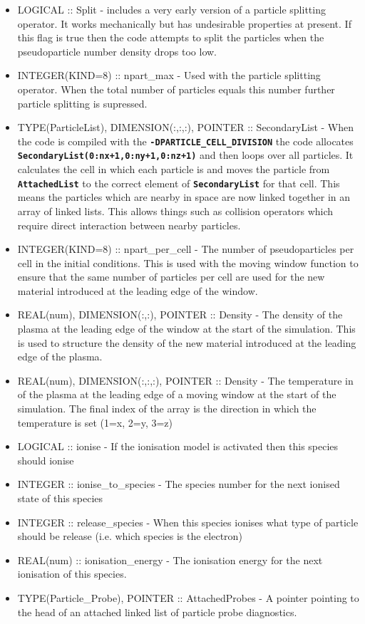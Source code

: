 \documentclass[12pt,a4paper]{article}
\newcommand{\inlinecode}[1]{{\color{warwickred} \bf\texttt{#1}}}
\newcommand{\EPOCH}{{\color{warwickdark}\fontfamily{phv}\selectfont{EPOCH}}}
\begin{document}
\begin{itemize}
\item LOGICAL :: Split - {\EPOCH} includes a very early version of a particle
  splitting operator. It works mechanically but has undesirable properties at
  present. If this flag is true then the code attempts to split the particles
  when the pseudoparticle number density drops too low.
\item INTEGER(KIND=8) :: npart\_max - Used with the particle splitting
  operator. When the total number of particles equals this number further
  particle splitting is supressed.
\item TYPE(ParticleList), DIMENSION(:,:,:), POINTER :: SecondaryList - When the
  code is compiled with the \inlinecode{-DPARTICLE\_CELL\_DIVISION} the code
  allocates \inlinecode{SecondaryList(0:nx+1,0:ny+1,0:nz+1)} and then loops
  over all particles. It calculates the cell in which each particle is and
  moves the particle from \inlinecode{AttachedList} to the correct element of
  \inlinecode{SecondaryList} for that cell. This means the particles which are
  nearby in space are now linked together in an array of linked lists. This
  allows things such as collision operators which require direct interaction
  between nearby particles.
\item INTEGER(KIND=8) :: npart\_per\_cell - The number of pseudoparticles per
  cell in the initial conditions. This is used with the moving window function
  to ensure that the same number of particles per cell are used for the new
  material introduced at the leading edge of the window.
\item REAL(num), DIMENSION(:,:), POINTER :: Density - The density of the plasma
  at the leading edge of the window at the start of the simulation. This is
  used to structure the density of the new material introduced at the leading
  edge of the plasma.
\item REAL(num), DIMENSION(:,:,:), POINTER :: Density - The temperature in of
  the plasma at the leading edge of a moving window at the start of the
  simulation. The final index of the array is the direction in which the
  temperature is set (1=x, 2=y, 3=z)
\item LOGICAL :: ionise - If the ionisation model is activated then this
  species should ionise
\item INTEGER :: ionise\_to\_species - The species number for the next ionised
  state of this species
\item INTEGER :: release\_species - When this species ionises what type of
  particle should be release (i.e. which species is the electron)
\item REAL(num) :: ionisation\_energy - The ionisation energy for the next
  ionisation of this species.
\item TYPE(Particle\_Probe), POINTER :: AttachedProbes - A pointer pointing to
  the head of an attached linked list of particle probe diagnostics.
\end{itemize}
\end{document}
